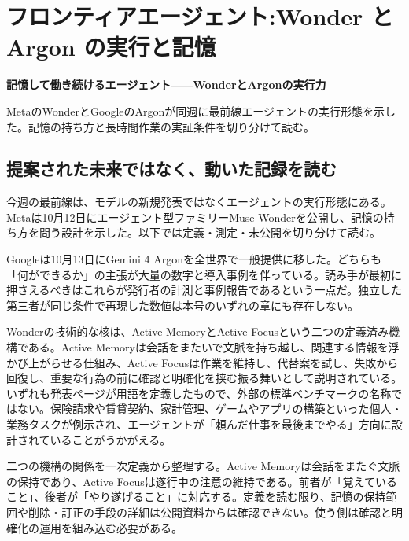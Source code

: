 \documentclass[lualatex,a4paper,10pt]{jlreq}
\begin{document}
\surveycover
\clearpage
\twocolumn

\section{フロンティアエージェント:Wonder と Argon の実行と記憶}
\label{sec:P1}

{\Large\bfseries 記憶して働き続けるエージェント――WonderとArgonの実行力\par}
\smallskip
{\color{SurveyMuted}MetaのWonderとGoogleのArgonが同週に最前線エージェントの実行形態を示した。記憶の持ち方と長時間作業の実証条件を切り分けて読む。\par}
\bigskip

\subsection*{提案された未来ではなく、動いた記録を読む}

今週の最前線は、モデルの新規発表ではなくエージェントの実行形態にある。Metaは10月12日にエージェント型ファミリーMuse Wonderを公開し、記憶の持ち方を問う設計を示した。以下では定義・測定・未公開を切り分けて読む。
\cite{B01,B62,B63,B02,B64,B03}


Googleは10月13日にGemini 4 Argonを全世界で一般提供に移した。どちらも「何ができるか」の主張が大量の数字と導入事例を伴っている。読み手が最初に押さえるべきはこれらが発行者の計測と事例報告であるという一点だ。独立した第三者が同じ条件で再現した数値は本号のいずれの章にも存在しない。
\cite{B05,B65,B08,B04,B07,B06}


Wonderの技術的な核は、Active MemoryとActive Focusという二つの定義済み機構である。Active Memoryは会話をまたいで文脈を持ち越し、関連する情報を浮かび上がらせる仕組み、Active Focusは作業を維持し、代替案を試し、失敗から回復し、重要な行為の前に確認と明確化を挟む振る舞いとして説明されている。いずれも発表ページが用語を定義したもので、外部の標準ベンチマークの名称ではない。保険請求や賃貸契約、家計管理、ゲームやアプリの構築といった個人・業務タスクが例示され、エージェントが「頼んだ仕事を最後までやる」方向に設計されていることがうかがえる。
\cite{B01,B62,B63,B02,B64,B03}


二つの機構の関係を一次定義から整理する。Active Memoryは会話をまたぐ文脈の保持であり、Active Focusは遂行中の注意の維持である。前者が「覚えていること」、後者が「やり遂げること」に対応する。定義を読む限り、記憶の保持範囲や削除・訂正の手段の詳細は公開資料からは確認できない。使う側は確認と明確化の運用を組み込む必要がある。
\cite{B01,B62,B63,B02,B64,B03}
\end{document}
